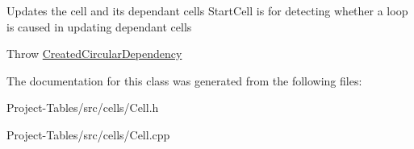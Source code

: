 Updates the cell and it\textquotesingle{}s dependant cells Start\+Cell is for detecting whether a loop is caused in updating dependant cells

Throw \hyperlink{structCreatedCircularDependency}{Created\+Circular\+Dependency} 

The documentation for this class was generated from the following files\+:\begin{DoxyCompactItemize}
\item 
Project-\/\+Tables/src/cells/Cell.\+h\item 
Project-\/\+Tables/src/cells/Cell.\+cpp\end{DoxyCompactItemize}
